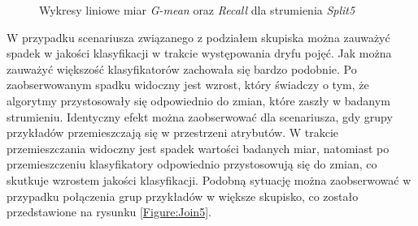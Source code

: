 \begin{figure}[h]
    \centering
    \qquad
    \caption{Wykresy liniowe miar \textit{G-mean} oraz \textit{Recall} dla strumienia \textit{Split5}}\label{Figure:Split5}
\end{figure}

\noindent W przypadku scenariusza związanego z podziałem skupiska można zauważyć spadek w jakości klasyfikacji w trakcie występowania dryfu pojęć. Jak można zauważyć większość klasyfikatorów zachowała się bardzo podobnie. Po zaobserwowanym spadku widoczny jest wzrost, który świadczy o tym, że algorytmy przystosowały się odpowiednio do zmian, które zaszły w badanym strumieniu. Identyczny efekt można zaobserwować dla scenariusza, gdy grupy przykładów przemieszczają się w przestrzeni atrybutów. W trakcie przemieszczania widoczny jest spadek wartości badanych miar, natomiast po przemieszczeniu klasyfikatory odpowiednio przystosowują się do zmian, co skutkuje wzrostem jakości klasyfikacji. Podobną sytuację można zaobserwować w przypadku połączenia grup przykładów w większe skupisko, co zostało przedstawione na rysunku \ref{Figure:Join5}.

